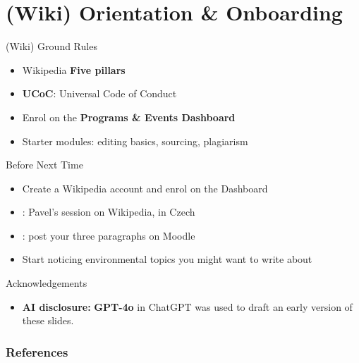 \documentclass[aspectratio=169]{beamer}
\begin{document}
\section{(Wiki) Orientation \& Onboarding}

\begin{frame}{(Wiki) Ground Rules}
\begin{itemize}
  \item Wikipedia \textbf{Five pillars} \citep{wikipediaFivePillars}
  \item \textbf{UCoC}: Universal Code of Conduct \citep{WikimediaUCoC}
  \item Enrol on the \textbf{Programs \& Events Dashboard} \citep{WikiEduDashboard}
  \item Starter modules: editing basics, sourcing, plagiarism
\end{itemize}
\end{frame}

\begin{frame}{Before Next Time}
\begin{itemize}
  \item Create a Wikipedia account and enrol on the Dashboard
  \item \textbf{\dateWiki}: Pavel's session on Wikipedia, in Czech
  \item \textbf{\deadlineTask}: post your three paragraphs on Moodle
  \item Start noticing environmental topics you might want to write about
\end{itemize}
\end{frame}

\begin{frame}{Acknowledgements}
  \small
  \begin{itemize}
  \item \textbf{AI disclosure:} \textbf{GPT-4o} in ChatGPT
    \citep{openai-chatgpt-2025-03-14} was used to draft an early version of
    these slides.
  \aicheck
  \end{itemize}
\end{frame}

\begin{frame}[allowframebreaks]
\frametitle{References}
\printbibliography[heading=none]
\end{frame}
\end{document}

